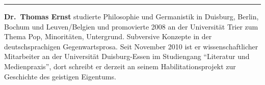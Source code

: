 \begin{center}\rule{0.5\linewidth}{\linethickness}\end{center}

\textbf{Dr.~Thomas Ernst} studierte Philosophie und Germanistik in
Duisburg, Berlin, Bochum und Leuven/Belgien und promovierte 2008 an der
Universität Trier zum Thema Pop, Minoritäten, Untergrund. Subversive
Konzepte in der deutschsprachigen Gegenwartsprosa. Seit November 2010
ist er wissenschaftlicher Mitarbeiter an der Universität Duisburg-Essen
im Studiengang ``Literatur und Medienpraxis'', dort schreibt er derzeit
an seinem Habilitationsprojekt zur Geschichte des geistigen Eigentums.
